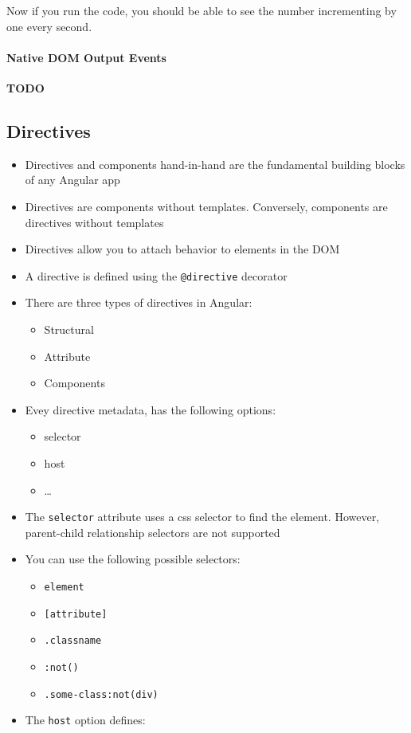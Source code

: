 \documentclass[12pt,]{article}
\providecommand{\tightlist}{%
  \setlength{\itemsep}{0pt}\setlength{\parskip}{0pt}}
\let\oldparagraph\paragraph
\renewcommand{\paragraph}[1]{\oldparagraph{#1}\mbox{}}
\begin{document}
Now if you run the code, you should be able to see the number
incrementing by one every second.

\paragraph{Native DOM Output Events}\label{native-dom-output-events}

\textbf{TODO}

\subsection{Directives}\label{directives}

\begin{itemize}
\tightlist
\item
  Directives and components hand-in-hand are the fundamental building
  blocks of any Angular app
\item
  Directives are components without templates. Conversely, components
  are directives without templates
\item
  Directives allow you to attach behavior to elements in the DOM
\item
  A directive is defined using the \texttt{@directive} decorator
\item
  There are three types of directives in Angular:

  \begin{itemize}
  \tightlist
  \item
    Structural
  \item
    Attribute
  \item
    Components
  \end{itemize}
\item
  Evey directive metadata, has the following options:

  \begin{itemize}
  \tightlist
  \item
    selector
  \item
    host
  \item
    \ldots{}
  \end{itemize}
\item
  The \texttt{selector} attribute uses a css selector to find the
  element. However, parent-child relationship selectors are not
  supported
\item
  You can use the following possible selectors:

  \begin{itemize}
  \tightlist
  \item
    \texttt{element}
  \item
    \texttt{{[}attribute{]}}
  \item
    \texttt{.classname}
  \item
    \texttt{:not()}
  \item
    \texttt{.some-class:not(div)}
  \end{itemize}
\item
  The \texttt{host} option defines:


\end{itemize}
\end{document}

